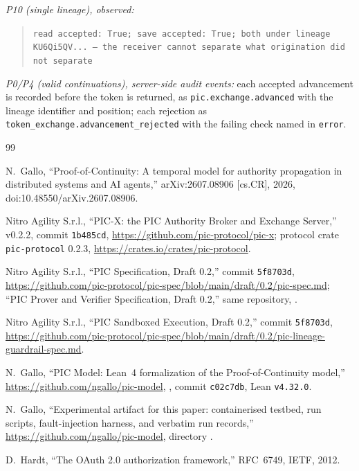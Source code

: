 \documentclass[conference]{IEEEtran}
\begin{document}
\emph{P10 (single lineage), observed:}
\begin{quote}
\scriptsize
\texttt{read accepted: True; save accepted: True; both under lineage KU6Qi5QV... --- the receiver cannot separate what origination did not separate}
\end{quote}

\emph{P0/P4 (valid continuations), server-side audit events:} each accepted advancement is recorded before the token is returned, as \texttt{pic.exchange.advanced} with the lineage identifier and position; each rejection as \texttt{token\_exchange.advancement\_rejected} with the failing check named in \texttt{error}.

\begin{thebibliography}{99}

 N.~Gallo, ``Proof-of-Continuity: A temporal model for authority propagation in distributed systems and AI agents,'' arXiv:2607.08906 [cs.CR], 2026, doi:10.48550/arXiv.2607.08906.

 Nitro Agility S.r.l., ``PIC-X: the PIC Authority Broker and Exchange Server,'' v0.2.2, commit \texttt{1b485cd}, \url{https://github.com/pic-protocol/pic-x}; protocol crate \texttt{pic-protocol} 0.2.3, \url{https://crates.io/crates/pic-protocol}.

 Nitro Agility S.r.l., ``PIC Specification, Draft 0.2,'' commit \texttt{5f8703d}, \url{https://github.com/pic-protocol/pic-spec/blob/main/draft/0.2/pic-spec.md}; ``PIC Prover and Verifier Specification, Draft 0.2,'' same repository, .

 Nitro Agility S.r.l., ``PIC Sandboxed Execution, Draft 0.2,'' commit \texttt{5f8703d}, \url{https://github.com/pic-protocol/pic-spec/blob/main/draft/0.2/pic-lineage-guardrail-spec.md}.

 N.~Gallo, ``PIC Model: Lean~4 formalization of the Proof-of-Continuity model,'' \url{https://github.com/ngallo/pic-model}, , commit \texttt{c02c7db}, Lean \texttt{v4.32.0}.

 N.~Gallo, ``Experimental artifact for this paper: containerised testbed, run scripts, fault-injection harness, and verbatim run records,'' \url{https://github.com/ngallo/pic-model}, directory .

 D.~Hardt, ``The OAuth 2.0 authorization framework,'' RFC~6749, IETF, 2012.


\end{thebibliography}
\end{document}
